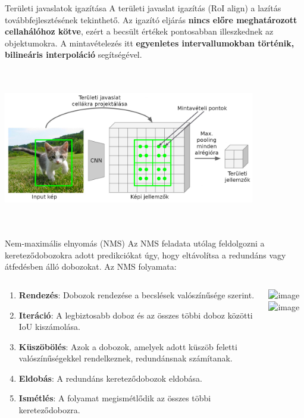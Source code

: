 \documentclass[english, aspectratio=169]{beamer}
\begin{document}
\begin{frame}{Területi javaslatok igazítása}
A területi javaslat igazítás (RoI align) a lazítás továbbfejlesztésének tekinthető. Az igazító eljárás \textbf{nincs előre meghatározott cellahálóhoz kötve}, ezért a becsült értékek pontosabban illeszkednek az objektumokra. A mintavételezés itt \textbf{egyenletes intervallumokban történik, bilineáris interpoláció} segítségével.
\begin{center}
\includegraphics[height=7cm, width=11cm, keepaspectratio]{images/instance_19.png}
\end{center}
\end{frame}

\begin{frame}{Nem-maximális elnyomás (NMS)}
Az NMS feladata utólag feldolgozni a kereteződobozokra adott predikciókat úgy, hogy eltávolítsa a redundáns vagy átfedésben álló dobozokat. Az NMS folyamata:
\begin{columns}
\begin{column}{.6\textwidth}
\begin{enumerate}
	\item \textbf{Rendezés}: Dobozok rendezése a becslések valószínűsége szerint.
	\item \textbf{Iteráció}: A legbiztosabb doboz és az összes többi doboz közötti IoU kiszámolása.
	\item \textbf{Küszöbölés}: Azok a dobozok, amelyek adott küszöb feletti valószínűségekkel rendelkeznek, redundánsnak számítanak. 
	\item \textbf{Eldobás}: A redundáns kereteződobozok eldobása.
	\item \textbf{Ismétlés}: A folyamat megismétlődik az összes többi kereteződobozra. 
\end{enumerate}
\end{column}
\begin{column}{.4\textwidth}
\begin{center}
\includegraphics<1>[height=7cm, width=6cm, keepaspectratio]{images/instance_20.png}
\includegraphics<2>[height=7cm, width=6cm, keepaspectratio]{images/instance_21.png}
\end{center}
\end{column}
\end{columns}
\end{frame}
\end{document}
